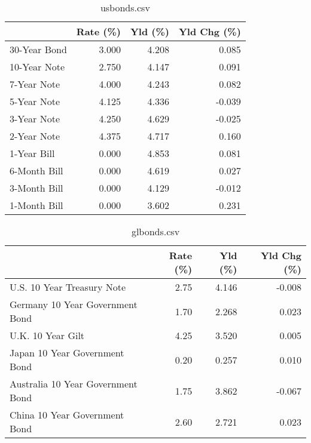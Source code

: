 \documentclass{article}%
\begin{document}
%


\begin{table}[htbp]%
\caption{usbonds.csv}%
\centering%
\begin{adjustbox}{width=1\textwidth}%
\begin{tabular}{lrrr}
\toprule
             &  Rate (\%) &  Yld (\%) &  Yld Chg (\%) \\
\midrule
30-Year Bond &     3.000 &    4.208 &        0.085 \\
10-Year Note &     2.750 &    4.147 &        0.091 \\
 7-Year Note &     4.000 &    4.243 &        0.082 \\
 5-Year Note &     4.125 &    4.336 &       -0.039 \\
 3-Year Note &     4.250 &    4.629 &       -0.025 \\
 2-Year Note &     4.375 &    4.717 &        0.160 \\
 1-Year Bill &     0.000 &    4.853 &        0.081 \\
6-Month Bill &     0.000 &    4.619 &        0.027 \\
3-Month Bill &     0.000 &    4.129 &       -0.012 \\
1-Month Bill &     0.000 &    3.602 &        0.231 \\
\bottomrule
\end{tabular}
%
\end{adjustbox}%
\end{table}

%


\begin{table}[htbp]%
\caption{glbonds.csv}%
\centering%
\begin{adjustbox}{width=1\textwidth}%
\begin{tabular}{lrrr}
\toprule
                                  &  Rate (\%) &  Yld (\%) &  Yld Chg (\%) \\
\midrule
       U.S. 10 Year Treasury Note &      2.75 &    4.146 &       -0.008 \\
  Germany 10 Year Government Bond &      1.70 &    2.268 &        0.023 \\
                U.K. 10 Year Gilt &      4.25 &    3.520 &        0.005 \\
    Japan 10 Year Government Bond &      0.20 &    0.257 &        0.010 \\
Australia 10 Year Government Bond &      1.75 &    3.862 &       -0.067 \\
    China 10 Year Government Bond &      2.60 &    2.721 &        0.023 \\
\bottomrule
\end{tabular}
%
\end{adjustbox}%
\end{table}
\end{document}
